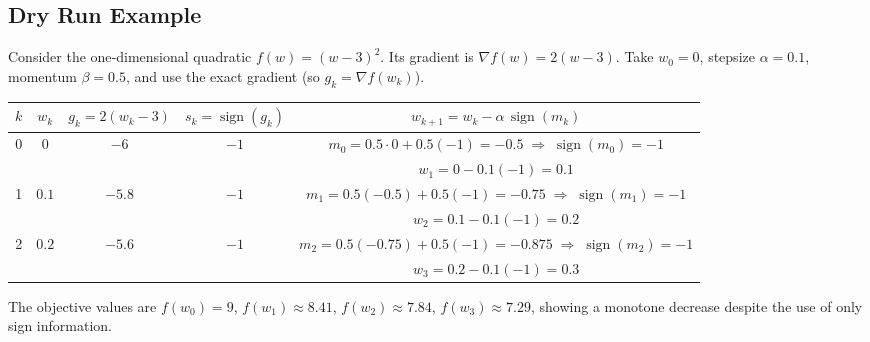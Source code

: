 \documentclass{article}
\newcommand{\sgn}{\operatorname{sign}}
\begin{document}
\subsection*{Dry Run Example}
Consider the one‑dimensional quadratic $f(w)=(w-3)^{2}$.
Its gradient is $\nabla f(w)=2(w-3)$.  
Take $w_{0}=0$, stepsize $\alpha=0.1$, momentum $\beta=0.5$,
and use the exact gradient (so $g_{k}=\nabla f(w_{k})$).

\begin{center}
\begin{tabular}{c|c|c|c|c}
$k$ & $w_{k}$ & $g_{k}=2(w_{k}-3)$ & $s_{k}=\sgn(g_{k})$ & $w_{k+1}=w_{k}-\alpha\,\sgn(m_{k})$\\\hline
0 & $0$ & $-6$ & $-1$ &
    $m_{0}=0.5\cdot0+0.5(-1)=-0.5\;\Rightarrow\;\sgn(m_{0})=-1$\\
  &   &   &   & $w_{1}=0-0.1(-1)=0.1$\\\hline
1 & $0.1$ & $-5.8$ & $-1$ &
    $m_{1}=0.5(-0.5)+0.5(-1)=-0.75\;\Rightarrow\;\sgn(m_{1})=-1$\\
  &   &   &   & $w_{2}=0.1-0.1(-1)=0.2$\\\hline
2 & $0.2$ & $-5.6$ & $-1$ &
    $m_{2}=0.5(-0.75)+0.5(-1)=-0.875\;\Rightarrow\;\sgn(m_{2})=-1$\\
  &   &   &   & $w_{3}=0.2-0.1(-1)=0.3$\\\hline
\end{tabular}
\end{center}
The objective values are $f(w_{0})=9$, $f(w_{1})\approx8.41$, $f(w_{2})\approx7.84$, $f(w_{3})\approx7.29$,
showing a monotone decrease despite the use of only sign information.

\end{document}
